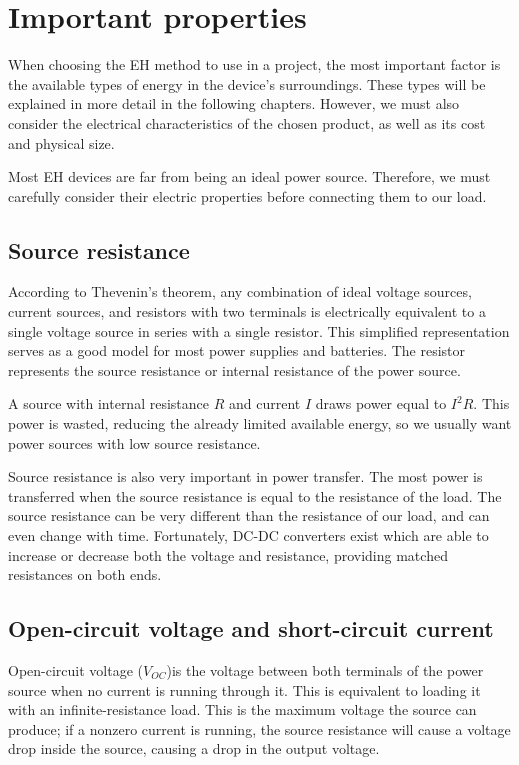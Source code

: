 \documentclass[a4paper,10pt]{article}
\begin{document}
\section{Important properties}

When choosing the \ac{EH} method to use in a project, the most important factor is the available types of energy in the device's surroundings. These types will be explained in more detail in the following chapters. However, we must also consider the electrical characteristics of the chosen product, as well as its cost and physical size. 

Most \ac{EH} devices are far from being an ideal power source. Therefore, we must carefully consider their electric properties before connecting them to our load. 

\subsection{Source resistance}

According to Thevenin's theorem, any combination of ideal voltage sources, current sources, and resistors with two terminals is electrically equivalent to a single voltage source in series with a single resistor. This simplified representation serves as a good model for most power supplies and batteries. The resistor represents the source resistance or internal resistance of the power source. 

A source with internal resistance $R$ and current $I$ draws power equal to $I^2 R$. This power is wasted, reducing the already limited available energy, so we usually want power sources with low source resistance. 

Source resistance is also very important in power transfer. The most power is transferred when the source resistance is equal to the resistance of the load. The source resistance can be very different than the resistance of our load, and can even change with time. Fortunately, DC-DC converters exist which are able to increase or decrease both the voltage and resistance, providing matched resistances on both ends. 

\subsection{Open-circuit voltage and short-circuit current}

Open-circuit voltage ($V_{OC}$)is the voltage between both terminals of the power source when no current is running through it. This is equivalent to loading it with an infinite-resistance load. This is the maximum voltage the source can produce; if a nonzero current is running, the source resistance will cause a voltage drop inside the source, causing a drop in the output voltage. 
\end{document}
